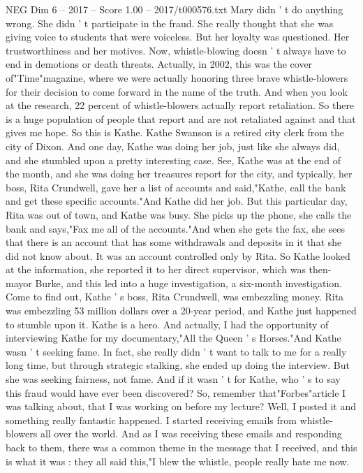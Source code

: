 \begin{textsample}{NEG Dim 6 – 2017 – Score 1.00 – 2017/t000576.txt}
Mary didn ' t do anything wrong.
She didn ' t participate in the fraud.
She really thought that she was giving voice to students that were voiceless.
But her loyalty was questioned.
Her trustworthiness and her motives.
Now, whistle-blowing doesn ' t always have to end in demotions or death threats.
Actually, in 2002, this was the cover of"Time"magazine, where we were actually honoring three brave whistle-blowers for their decision to come forward in the name of the truth.
And when you look at the research, 22 percent of whistle-blowers actually report retaliation.
So there is a huge population of people that report and are not retaliated against and that gives me hope.
So this is Kathe.
Kathe Swanson is a retired city clerk from the city of Dixon.
And one day, Kathe was doing her job, just like she always did, and she stumbled upon a pretty interesting case.
See, Kathe was at the end of the month, and she was doing her treasures report for the city, and typically, her boss, Rita Crundwell, gave her a list of accounts and said,"Kathe, call the bank and get these specific accounts."And Kathe did her job.
But this particular day, Rita was out of town, and Kathe was busy.
She picks up the phone, she calls the bank and says,"Fax me all of the accounts."And when she gets the fax, she sees that there is an account that has some withdrawals and deposits in it that she did not know about.
It was an account controlled only by Rita.
So Kathe looked at the information, she reported it to her direct supervisor, which was then-mayor Burke, and this led into a huge investigation, a six-month investigation.
Come to find out, Kathe ' s boss, Rita Crundwell, was embezzling money.
Rita was embezzling 53 million dollars over a 20-year period, and Kathe just happened to stumble upon it.
Kathe is a hero.
And actually, I had the opportunity of interviewing Kathe for my documentary,"All the Queen ' s Horses."And Kathe wasn ' t seeking fame.
In fact, she really didn ' t want to talk to me for a really long time, but through strategic stalking, she ended up doing the interview.
But she was seeking fairness, not fame.
And if it wasn ' t for Kathe, who ' s to say this fraud would have ever been discovered?
So, remember that"Forbes"article I was talking about, that I was working on before my lecture?
Well, I posted it and something really fantastic happened.
I started receiving emails from whistle-blowers all over the world.
And as I was receiving these emails and responding back to them, there was a common theme in the message that I received, and this is what it was : they all said this,"I blew the whistle, people really hate me now.

\end{textsample}
